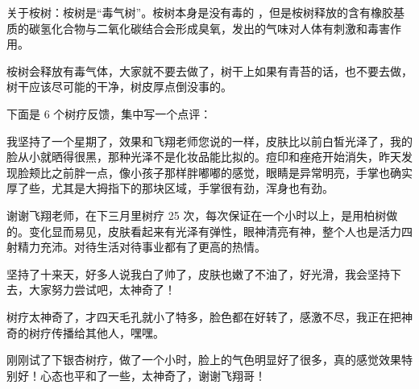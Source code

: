 关于桉树：桉树是“毒气树”。桉树本身是没有毒的 ，但是桉树释放的含有橡胶基质的碳氢化合物与二氧化碳结合会形成臭氧，发出的气味对人体有刺激和毒害作用。

桉树会释放有毒气体，大家就不要去做了，树干上如果有青苔的话，也不要去做，树干应该尽可能的干净，树皮厚点倒没事的。

下面是 6 个树疗反馈，集中写一个点评：

\begin{case}[树疗]
    我坚持了一个星期了，效果和飞翔老师您说的一样，皮肤比以前白皙光泽了，我的脸从小就晒得很黑，那种光泽不是化妆品能比拟的。痘印和痤疮开始消失，昨天发现脸颊比之前胖一点，像小孩子那样胖嘟嘟的感觉，眼睛是异常明亮，手掌也确实厚了些，尤其是大拇指下的那块区域，手掌很有劲，浑身也有劲。
\end{case}

\begin{case}[树疗]
    谢谢飞翔老师，在下三月里树疗 25 次，每次保证在一个小时以上，是用柏树做的。变化显而易见，皮肤看起来有光泽有弹性，眼神清亮有神，整个人也是活力四射精力充沛。对待生活对待事业都有了更高的热情。
\end{case}

\begin{case}[树疗]
    坚持了十来天，好多人说我白了帅了，皮肤也嫩了不油了，好光滑，我会坚持下去，大家努力尝试吧，太神奇了！
\end{case}

\begin{case}[树疗]
    树疗太神奇了，才四天毛孔就小了特多，脸色都在好转了，感激不尽，我正在把神奇的树疗传播给其他人，嘿嘿。
\end{case}

\begin{case}[树疗]
    刚刚试了下银杏树疗，做了一个小时，脸上的气色明显好了很多，真的感觉效果特别好！心态也平和了一些，太神奇了，谢谢飞翔哥！
\end{case}

